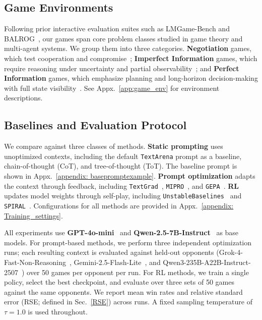 

\subsection{Game Environments}
Following prior interactive evaluation suites such as LMGame-Bench and BALROG~\citep{hu2025lmgamebenchgoodllmsplaying, paglieri2025balrogbenchmarkingagenticllm}, our games span core problem classes studied in game theory and multi-agent systems. We group them into three categories. \textbf{Negotiation} games, which test cooperation and compromise~\citep{negotiationandhonesty, abdelnabi2024llmdeliberation}; \textbf{Imperfect Information} games, which require reasoning under uncertainty and partial observability~\citep{DBLP:journals/corr/abs-2007-13544, guo2024suspicionagent}; and \textbf{Perfect Information} games, which emphasize planning and long-horizon decision-making with full state visibility~\citep{DBLP:journals/corr/abs-1712-01815}. See Appx.~\ref{app:game_env} for environment descriptions.

\subsection{Baselines and Evaluation Protocol}
\label{sec:optmization_settings}
\label{evaluation_setup}

We compare \NAME{} against three classes of methods.
\textbf{Static prompting} uses unoptimized contexts, including the default \texttt{TextArena} prompt as a baseline, chain-of-thought (CoT), and tree-of-thought (ToT). The baseline prompt is shown in Appx.~\ref{appendix: basepromptexample}.
\textbf{Prompt optimization} adapts the context through feedback, including \texttt{TextGrad}~\citep{yuksekgonul2024textgrad}, \texttt{MIPRO}~\citep{opsahl2024optimizing}, and \texttt{GEPA}~\citep{agrawal2025gepa}.
\textbf{RL} updates model weights through self-play, including \texttt{UnstableBaselines}~\citep{Guertler_UnstableBaselines_2025} and \texttt{SPIRAL}~\citep{liu2025spiral}.
Configurations for all methods are provided in Appx.~\ref{appendix: Training_settings}.

All experiments use \textbf{GPT-4o-mini}~\citep{openai2024gpt4o_mini} and \textbf{Qwen-2.5-7B-Instruct}~\citep{yang2025qwen2_5} as base models.
For prompt-based methods, we perform three independent optimization runs; each resulting context is evaluated against held-out opponents (Grok-4-Fast-Non-Reasoning~\citep{grok4_fast_nonreasoning_2025}, Gemini-2.5-Flash-Lite~\citep{comanici2025gemini}, and Qwen3-235B-A22B-Instruct-2507~\citep{yang2025qwen2_5}) over 50 games per opponent per run.
For RL methods, we train a single policy, select the best checkpoint, and evaluate over three sets of 50 games against the same opponents.
We report mean win rates and relative standard error (RSE; defined in Sec.~\ref{RSE}) across runs. A fixed sampling temperature of $\tau=1.0$ is used throughout.


